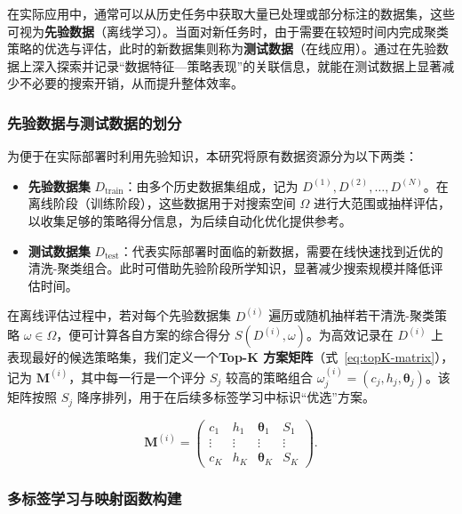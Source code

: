 \documentclass[10pt]{article} %
\numberwithin{equation}{section}
\begin{document}
在实际应用中，通常可以从历史任务中获取大量已处理或部分标注的数据集，这些可视为\textbf{先验数据}（离线学习）。当面对新任务时，由于需要在较短时间内完成聚类策略的优选与评估，此时的新数据集则称为\textbf{测试数据}（在线应用）。通过在先验数据上深入探索并记录“数据特征—策略表现”的关联信息，就能在测试数据上显著减少不必要的搜索开销，从而提升整体效率。

\subsubsection{先验数据与测试数据的划分}
\label{subsec:dataset-split}

为便于在实际部署时利用先验知识，本研究将原有数据资源分为以下两类：
\begin{itemize}
    \item \textbf{先验数据集} $D_{\text{train}}$：由多个历史数据集组成，记为 ${D^{(1)}, D^{(2)}, \dots, D^{(N)}}$。在离线阶段（训练阶段），这些数据用于对搜索空间 $\Omega$ 进行大范围或抽样评估，以收集足够的策略得分信息，为后续自动化优化提供参考。
    \item \textbf{测试数据集} $D_{\text{test}}$：代表实际部署时面临的新数据，需要在线快速找到近优的清洗-聚类组合。此时可借助先验阶段所学知识，显著减少搜索规模并降低评估时间。
\end{itemize}

在离线评估过程中，若对每个先验数据集 $D^{(i)}$ 遍历或随机抽样若干清洗-聚类策略 $\omega \in \Omega$，便可计算各自方案的综合得分 $S(D^{(i)}, \omega)$。为高效记录在 $D^{(i)}$ 上表现最好的候选策略集，我们定义一个\textbf{Top-K 方案矩阵}（式~\eqref{eq:topK-matrix}），记为 $\mathbf{M}^{(i)}$，其中每一行是一个评分 $S_j$ 较高的策略组合 $\omega_j^{(i)}=(c_j,h_j,\boldsymbol{\theta}_j)$。该矩阵按照 $S_j$ 降序排列，用于在后续多标签学习中标识“优选”方案。

\begin{equation}\label{eq:topK-matrix}
\mathbf{M}^{(i)} 
= 
\begin{pmatrix}
c_1 & h_1 & \boldsymbol{\theta}_1 & S_1 \\
\vdots & \vdots & \vdots & \vdots \\
c_K & h_K & \boldsymbol{\theta}_K & S_K
\end{pmatrix}.
\end{equation}

\subsubsection{多标签学习与映射函数构建}
\label{subsec:multi-label}
\end{document}
